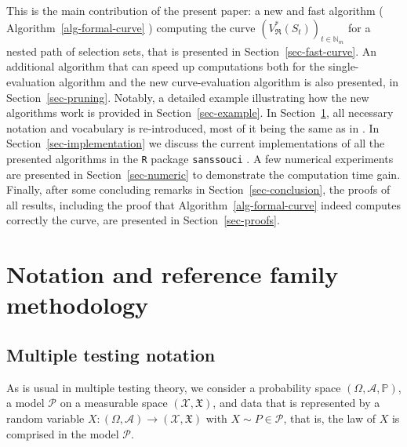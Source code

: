 \documentclass[
  11pt,
  a4paper,
]{article}
\theoremstyle{definition}
\theoremstyle{plain}
\theoremstyle{plain}
\theoremstyle{plain}
\theoremstyle{definition}
\theoremstyle{remark}
\begin{document}
This is the main contribution of the present paper: a new and fast
algorithm ( Algorithm~\ref{alg-formal-curve} ) computing the curve
\(\left(V^*_{\mathfrak{R}}(S_t)\right)_{t\in\mathbb{N}_m}\) for a nested
path of selection sets, that is presented in
Section~\ref{sec-fast-curve}. An additional algorithm that can speed up
computations both for the single-evaluation algorithm and the new
curve-evaluation algorithm is also presented, in
Section~\ref{sec-pruning}. Notably, a detailed example illustrating how
the new algorithms work is provided in Section~\ref{sec-example}. In
Section~\ref{sec-notation}, all necessary notation and vocabulary is
re-introduced, most of it being the same as in \citet{MR4178188}. In
Section~\ref{sec-implementation} we discuss the current implementations
of all the presented algorithms in the \texttt{R} \citep{R-base} package
\texttt{sanssouci} \citep{sanssouci}. A few numerical experiments are
presented in Section~\ref{sec-numeric} to demonstrate the computation
time gain. Finally, after some concluding remarks in
Section~\ref{sec-conclusion}, the proofs of all results, including the
proof that  Algorithm~\ref{alg-formal-curve}  indeed computes correctly
the curve, are presented in Section~\ref{sec-proofs}.

\section{Notation and reference family methodology}\label{sec-notation}

\subsection{Multiple testing notation}\label{multiple-testing-notation}

As is usual in multiple testing theory, we consider a probability space
\((\Omega,\mathcal A, \mathbb P)\), a model \(\mathcal{P}\) on a
measurable space \((\mathcal{X},\mathfrak{X})\), and data that is
represented by a random variable
\(X:(\Omega,\mathcal A)\to(\mathcal{X},\mathfrak{X})\) with
\(X\sim P\in \mathcal{P}\), that is, the law of \(X\) is comprised in
the model \(\mathcal{P}\).
\end{document}
